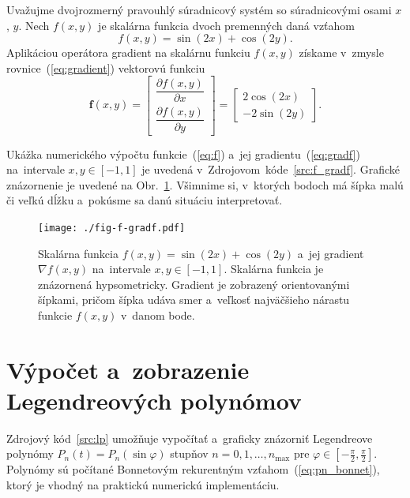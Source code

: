 \documentclass[a4paper,12pt]{book}
\let\vec\mathbf
\begin{document}
Uvažujme dvojrozmerný pravouhlý súradnicový systém so súradnicovými osami $x$,
$y$.  Nech $f(x, y)$ je skalárna funkcia dvoch premenných daná vzťahom
%
\begin{equation}
\label{eq:f}
f(x, y) = \sin(2x) + \cos(2y){.}
\end{equation}
%
Aplikáciou operátora gradient na skalárnu funkciu $f(x, y)$ získame v~zmysle
rovnice~(\ref{eq:gradient}) vektorovú funkciu
%
\begin{equation}
\label{eq:gradf}
\vec f(x, y) =
\begin{bmatrix}
\dfrac{\partial f(x, y)}{\partial x} \\[2ex]
\dfrac{\partial f(x, y)}{\partial y}
\end{bmatrix}
=
\begin{bmatrix}
2 \cos(2x) \\[2ex]
-2 \sin(2y)
\end{bmatrix}
{.}
\end{equation}

Ukážka numerického výpočtu funkcie~(\ref{eq:f}) a~jej
gradientu~(\ref{eq:gradf}) na~intervale $x, y \in [-1, 1]$ je uvedená
v~Zdrojovom~kóde~\ref{src:f_gradf}.  Grafické znázornenie je uvedené na
Obr.~\ref{fig:f_gradf}.  Všimnime si, v~ktorých bodoch má šípka malú či veľkú
dĺžku a~pokúsme sa danú situáciu interpretovať.



\begin{figure}[bt]
\centering
\texttt{[image: ./fig-f-gradf.pdf]}
\caption{Skalárna funkcia $f(x, y) = \sin(2x) + \cos(2y)$ a~jej gradient
$\nabla f(x, y)$ na~intervale $x, y \in [-1, 1]$.  Skalárna funkcia je
znázornená hypsometricky.  Gradient je zobrazený orientovanými šípkami, pričom
šípka udáva smer a~veľkosť najväčšieho nárastu funkcie $f(x, y)$ v~danom bode.}
\label{fig:f_gradf}
\end{figure}




\chapter{Výpočet a~zobrazenie Legendreových polynómov}
\label{app:lp}

Zdrojový kód~\ref{src:lp} umožňuje vypočítať a~graficky znázorniť Legendreove
polynómy $P_n(t) = P_n(\sin\varphi)$ stupňov $n = 0, 1, \dots, n_{\max}$ pre
$\varphi \in [-\frac{\pi}{2}, \frac{\pi}{2}]$.  Polynómy sú počítané Bonnetovým
rekurentným vzťahom~(\ref{eq:pn_bonnet}), ktorý je vhodný na praktickú
numerickú implementáciu.
\end{document}
